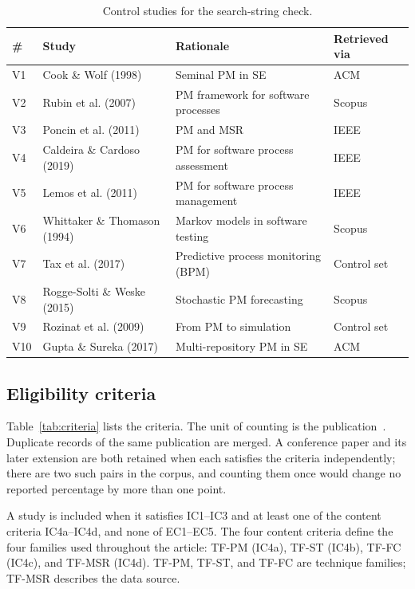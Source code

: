 \documentclass[preprint,12pt,authoryear=false]{elsarticle}
\newcommand{\PM}{TF-PM}
\newcommand{\ST}{TF-ST}
\newcommand{\FC}{TF-FC}
\newcommand{\MSR}{TF-MSR}
\begin{document}
\begin{table}[t]
\centering\small
\caption{Control studies for the search-string check.}\label{tab:control}
\footnotesize
\begin{tabularx}{\textwidth}{llXl}
\toprule
\# & Study & Rationale & Retrieved via \\
\midrule
V1 & Cook \& Wolf (1998) & Seminal PM in SE & ACM \\
V2 & Rubin et al. (2007) & PM framework for software processes & Scopus \\
V3 & Poncin et al. (2011) & PM and MSR & IEEE \\
V4 & Caldeira \& Cardoso (2019) & PM for software process assessment & IEEE \\
V5 & Lemos et al. (2011) & PM for software process management & IEEE \\
V6 & Whittaker \& Thomason (1994) & Markov models in software testing & Scopus \\
V7 & Tax et al. (2017) & Predictive process monitoring (BPM) & Control set \\
V8 & Rogge-Solti \& Weske (2015) & Stochastic PM forecasting & Scopus \\
V9 & Rozinat et al. (2009) & From PM to simulation & Control set \\
V10 & Gupta \& Sureka (2017) & Multi-repository PM in SE & ACM \\
\bottomrule
\end{tabularx}
\end{table}

\subsection{Eligibility criteria}\label{sec:criteria}

Table~\ref{tab:criteria} lists the criteria. The unit of counting is the publication~\cite{petersen2015}. Duplicate records of the same publication are merged. A conference paper and its later extension are both retained when each satisfies the criteria independently; there are two such pairs in the corpus, and counting them once would change no reported percentage by more than one point.

A study is included when it satisfies IC1--IC3 and at least one of the content criteria IC4a--IC4d, and none of EC1--EC5. The four content criteria define the four families used throughout the article: \PM{} (IC4a), \ST{} (IC4b), \FC{} (IC4c), and \MSR{} (IC4d). \PM{}, \ST{}, and \FC{} are technique families; \MSR{} describes the data source.
\end{document}

